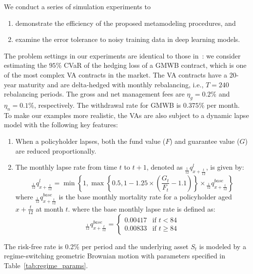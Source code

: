 We conduct a series of simulation experiments to 
\begin{enumerate}
    \item demonstrate the efficiency of the proposed metamodeling procedures, and
    \item examine the error tolerance to noisy training data in deep learning models.
\end{enumerate}
The problem settings in our experiments are identical to those in~\cite{dang2020efficient}:
we consider estimating the $95\%$ CVaR of the hedging loss of a GMWB contract, which is one of the most complex VA contracts in the market.
The VA contracts have a 20-year maturity and are delta-hedged with monthly rebalancing, i.e., $T=240$ rebalancing periods.
The gross and net management fees are $\eta_g = 0.2\%$ and $\eta_n=0.1\%$, respectively.
The withdrawal rate for GMWB is $0.375\%$ per month.
To make our examples more realistic, the VAs are also subject to a dynamic lapse model with the following key features:
\begin{enumerate}
    \item When a policyholder lapses, both the fund value ($F$) and guarantee value ($G$) are reduced proportionally.
    \item The monthly lapse rate from time $t$ to $t + 1$, denoted as ${}_{\frac{1}{12}}q^l_{x+\frac{t}{12}}$, is given by:
    \begin{equation}
        {}_{\frac{1}{12}}q^l_{x+\frac{t}{12}} = \min\left\{1, \max\left\{0.5, 1 - 1.25 \times \left(\frac{G_t}{F_t} - 1.1\right)\right\} \times {}_{\frac{1}{12}}q^{base}_{x+\frac{t}{12}}\right\}
    \end{equation}
    where ${}_{\frac{1}{12}}q^{base}_{x+\frac{t}{12}}$ is the base monthly mortality rate for a policyholder aged $x + \frac{t}{12}$ at month $t$.
    where the base monthly lapse rate is defined as:
    \begin{equation}
        {}_{\frac{1}{12}}q^{base}_{x+\frac{t}{12}} = 
        \begin{cases}
            0.00417 & \text{if } t < 84 \\
            0.00833 & \text{if } t \geq 84
        \end{cases}
    \end{equation}
\end{enumerate}

The risk-free rate is 0.2\% per period and the underlying asset $S_t$ is modeled by a regime-switching geometric Brownian motion with parameters specified in Table~\ref{tab:regime_params}.

